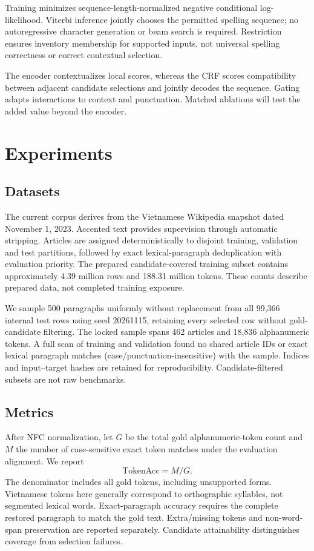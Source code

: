 \documentclass{article}
\begin{document}
Training minimizes sequence-length-normalized negative conditional log-likelihood. Viterbi inference jointly chooses the permitted spelling sequence; no autoregressive character generation or beam search is required. Restriction ensures inventory membership for supported inputs, not universal spelling correctness or correct contextual selection.

The encoder contextualizes local scores, whereas the CRF scores compatibility between adjacent candidate selections and jointly decodes the sequence. Gating adapts interactions to context and punctuation. Matched ablations will test the added value beyond the encoder.

\section{Experiments}
\subsection{Datasets}
The current corpus derives from the Vietnamese Wikipedia snapshot dated November 1, 2023. Accented text provides supervision through automatic stripping. Articles are assigned deterministically to disjoint training, validation and test partitions, followed by exact lexical-paragraph deduplication with evaluation priority. The prepared candidate-covered training subset contains approximately 4.39 million rows and 188.31 million tokens. These counts describe prepared data, not completed training exposure.

We sample 500 paragraphs uniformly without replacement from all 99,366 internal test rows using seed 20261115, retaining every selected row without gold-candidate filtering. The locked sample spans 462 articles and 18,836 alphanumeric tokens. A full scan of training and validation found no shared article IDs or exact lexical paragraph matches (case/punctuation-insensitive) with the sample. Indices and input--target hashes are retained for reproducibility. Candidate-filtered subsets are not raw benchmarks.

\subsection{Metrics}
After NFC normalization, let $G$ be the total gold alphanumeric-token count and $M$ the number of case-sensitive exact token matches under the evaluation alignment. We report
\begin{equation}
\mathrm{TokenAcc}=M/G.
\end{equation}
The denominator includes all gold tokens, including unsupported forms. Vietnamese tokens here generally correspond to orthographic syllables, not segmented lexical words. Exact-paragraph accuracy requires the complete restored paragraph to match the gold text. Extra/missing tokens and non-word-span preservation are reported separately. Candidate attainability distinguishes coverage from selection failures.
\end{document}
